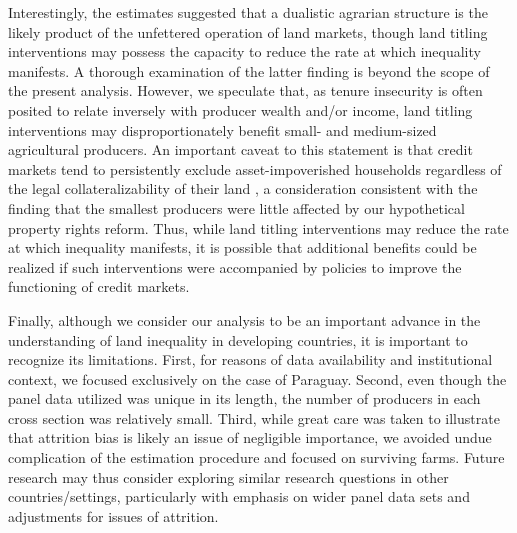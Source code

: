 \documentclass[english]{article}
\begin{document}
Interestingly, the estimates suggested that a dualistic agrarian structure is 
the likely product of the unfettered operation of land markets, though land 
titling interventions may possess the capacity to reduce the rate at which 
inequality manifests.
A thorough examination of the latter finding is beyond the scope of
the present analysis.
However, we speculate that, as tenure insecurity is often posited to relate
inversely with producer wealth and/or income, land titling interventions 
may disproportionately benefit small- and medium-sized agricultural 
producers.
An important caveat to this statement is that credit markets tend to 
persistently exclude asset-impoverished households regardless of the 
legal collateralizability of their land \citep{carter1988}, a consideration 
consistent with the finding that the smallest producers were little affected by 
our hypothetical property rights reform.
Thus, while land titling interventions may reduce the rate at which 
inequality manifests, it is possible that additional benefits could be realized if 
such interventions were accompanied by policies to improve the functioning
of credit markets.

Finally, although we consider our analysis to be an important advance in the 
understanding of land inequality in developing countries, it is important to 
recognize its limitations.
First, for reasons of data availability and institutional context, we focused
exclusively on the case of Paraguay. 
Second, even though the panel data utilized was unique in its length, the
number of producers in each cross section was relatively small.
Third, while great care was taken to illustrate that attrition bias is likely
an issue of negligible importance, we avoided undue complication of the 
estimation procedure and focused on surviving farms.
Future research may thus consider exploring similar research questions in 
other countries/settings, particularly with emphasis on wider panel data 
sets and adjustments for issues of attrition.
 

\newpage
\cleardoublepage
\singlespacing




\newpage

\end{document}
